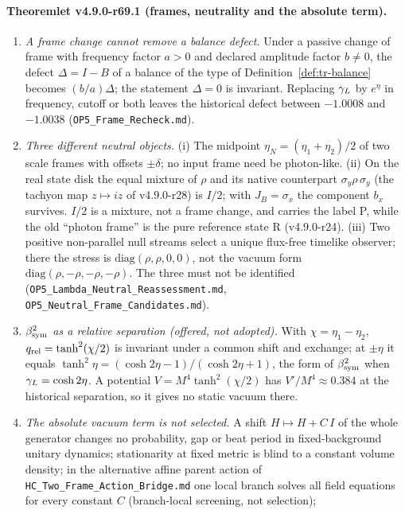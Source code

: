 \paragraph{Theoremlet v4.9.0-r69.1 (frames, neutrality and the absolute term).}
\begin{enumerate}[leftmargin=2em]
\item[(a)] \emph{A frame change cannot remove a balance defect.}  Under a passive change of frame with frequency factor \(a>0\) and declared amplitude
factor \(b\neq0\), the defect \(\Delta=I-B\) of a balance of the type of Definition~\ref{def:tr-balance} becomes \((b/a)\Delta\); the statement
\(\Delta=0\) is invariant.  Replacing \(\gamma_L\) by \(e^{\eta}\) in frequency, cutoff or both leaves the historical defect between \(-1.0008\) and \(-1.0038\)
(\texttt{OP5\_Frame\_Recheck.md}).
\item[(b)] \emph{Three different neutral objects.}  (i) The midpoint \(\eta_N=(\eta_1+\eta_2)/2\) of two scale frames with offsets \(\pm\delta\); no input frame
need be photon-like.  (ii) On the real state disk the equal mixture of \(\rho\) and its native counterpart \(\sigma_y\rho\,\sigma_y\) (the tachyon map
\(z\mapsto iz\) of v4.9.0-r28) is \(I/2\); with \(J_B=\sigma_x\) the component \(b_x\) survives.  \(I/2\) is a mixture, not a frame change, and carries the label P,
while the old ``photon frame'' is the pure reference state R (v4.9.0-r24).  (iii) Two positive non-parallel null streams select a unique flux-free timelike
observer; there the stress is \(\mathrm{diag}(\rho,\rho,0,0)\), not the vacuum form \(\mathrm{diag}(\rho,-\rho,-\rho,-\rho)\).  The three must not be identified
(\texttt{OP5\_Lambda\_Neutral\_Reassessment.md}, \texttt{OP5\_Neutral\_Frame\_Candidates.md}).
\item[(c)] \emph{\(\beta_{\mathrm{sym}}^2\) as a relative separation (offered, not adopted).}  With \(\chi=\eta_1-\eta_2\), \(q_{\rm rel}=\tanh^2(\chi/2)\) is invariant under a
common shift and exchange; at \(\pm\eta\) it equals \(\tanh^2\eta=(\cosh2\eta-1)/(\cosh2\eta+1)\), the form of \(\beta_{\mathrm{sym}}^2\) when \(\gamma_L=\cosh2\eta\).  A potential
\(V=M^4\tanh^2(\chi/2)\) has \(V'/M^4\approx0.384\) at the historical separation, so it gives no static vacuum there.
\item[(d)] \emph{The absolute vacuum term is not selected.}  A shift \(H\mapsto H+C\,I\) of the whole generator changes no probability, gap or beat period
in fixed-background unitary dynamics; stationarity at fixed metric is blind to a constant volume density; in the alternative affine parent action of
\texttt{HC\_Two\_Frame\_Action\_Bridge.md} one local branch solves all field equations for every constant \(C\) (branch-local screening, not selection);

\end{enumerate}
